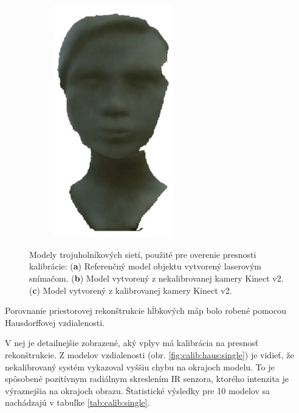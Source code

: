 \begin{figure}[H]
\begin{subfigure}[b]{0.32\textwidth}
		\caption{}
		\label{fig:calib:model:calib}
	\end{subfigure}
	\hskip 3pt 
	\begin{subfigure}[b]{0.32\textwidth}
		\centering
		\includegraphics[width=0.57\textwidth]{figures/calibration_models_uncalib.jpg}
		\caption{}
		\label{fig:calib:model:uncalib}
	\end{subfigure}
	\caption{Modely trojuholníkových sietí, použité pre overenie presnosti kalibrácie: (\textbf{a}) Referenčný model objektu vytvorený laserovým snímačom. (\textbf{b}) Model vytvorený z nekalibrovanej kamery Kinect v2. (\textbf{c}) Model vytvorený z kalibrovanej kamery Kinect v2. }
	\label{fig:calib:models}
\end{figure}


Porovnanie priestorovej rekonštrukcie hĺbkových máp bolo robené pomocou Hausdorffovej vzdialenosti.

V nej je detailnejšie zobrazené, aký vplyv má kalibrácia na presnosť rekonštrukcie. Z modelov vzdialenosti (obr. \ref{fig:calib:haus:single}) je vidieť, že nekalibrovaný systém vykazoval vyššiu chybu na okrajoch modelu. To je spôsobené pozitívnym radiálnym skreslením IR senzora, ktorého intenzita je výraznejšia na okrajoch obrazu. Štatistické výsledky pre 10 modelov sa nachádzajú v tabuľke \ref{tab:calib:single}.

